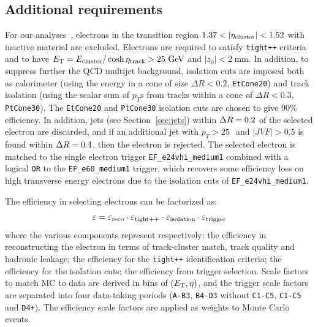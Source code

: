 \tocless\subsection{Additional requirements}\label{sec:REQtrigger}

For our analyses~\cite{topcommon2013}, electrons in the transition region $1.37<|\eta_{\rm cluster}| <1.52$
with inactive material are excluded. Electrons are required to satisfy \texttt{tight++} criteria and to
 have $\et = E_{\rm cluster}/\cosh\eta_{\rm track} > 25\gev$ and $|z_0|<2~$mm.
In addition, to suppress further the QCD multijet background, 
isolation cuts are imposed both as calorimeter (using the energy in a cone of size $\Delta R<0.2$, \texttt{EtCone20})
and track isolation (using the scalar sum of $p_T$s from tracks within a cone of $\Delta R<0.3$, \texttt{PtCone30}). 
The \texttt{EtCone20} and \texttt{PtCone30} isolation cuts are chosen to give
90\% efficiency.
In addition, jets (see Section~\ref{sec:jets}) within $\dr =0.2$ of the selected electron are 
discarded, and if an additional jet with $p_T>25~$\gev\  and $|JVF|>0.5$ is found within $\dr =0.4$,
then the electron is rejected.
The selected electron is matched to the single electron trigger \texttt{EF\_e24vhi\_medium1}
combined with a logical \texttt{OR} to the \texttt{EF\_e60\_medium1} trigger, which
recovers some efficiency loss on high transverse energy electrons due
to the isolation cuts of \texttt{EF\_e24vhi\_medium1}. %

The efficiency in selecting electrons can be factorized as:
\begin{equation}\label{eq:eleeff}
\varepsilon = \varepsilon_{\rm reco} \cdot\varepsilon_{\rm tight++} \cdot\varepsilon_{\rm isolation} \cdot\varepsilon_{\rm trigger} 
	\end{equation}
where the various components represent respectively: the efficiency in reconstructing the electron 
in terms of track-cluster match, track quality and hadronic leakage; the efficiency
for the \texttt{tight++} identification criteria; the efficiency for the isolation cuts;
the efficiency from trigger selection. Scale factors to match MC to data
are derived in bins of $(\ET,\eta)$,
and the trigger scale factors are separated into four data-taking periods 
(\texttt{A-B3}, \texttt{B4-D3} without \texttt{C1-C5}, \texttt{C1-C5} and \texttt{D4+}).
The efficiency scale factors are applied as weights to Monte Carlo events.

